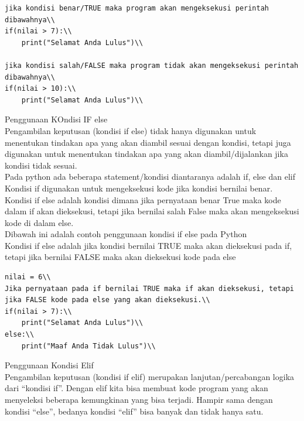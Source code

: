 \begin{enumerate}
\begin{verbatim}
jika kondisi benar/TRUE maka program akan mengeksekusi perintah dibawahnya\\
if(nilai > 7):\\
    print("Selamat Anda Lulus")\\

jika kondisi salah/FALSE maka program tidak akan mengeksekusi perintah dibawahnya\\
if(nilai > 10):\\
    print("Selamat Anda Lulus")\\
\end{verbatim}

Penggunaan KOndisi IF else\\

Pengambilan keputusan (kondisi if else) tidak hanya digunakan untuk menentukan tindakan apa yang akan diambil sesuai dengan kondisi, tetapi juga digunakan untuk menentukan tindakan apa yang akan diambil/dijalankan jika kondisi tidak sesuai.
\\
Pada python ada beberapa statement/kondisi diantaranya adalah if, else dan elif Kondisi if digunakan untuk mengeksekusi kode jika kondisi bernilai benar.
\\
Kondisi if else adalah kondisi dimana jika pernyataan benar True maka kode dalam if akan dieksekusi, tetapi jika bernilai salah False maka akan mengeksekusi kode di dalam else.
\\
Dibawah ini adalah contoh penggunaan kondisi if else pada Python
\\

Kondisi if else adalah jika kondisi bernilai TRUE maka akan dieksekusi pada if, tetapi jika bernilai FALSE maka akan dieksekusi kode pada else\\
\begin{verbatim}
nilai = 6\\
Jika pernyataan pada if bernilai TRUE maka if akan dieksekusi, tetapi jika FALSE kode pada else yang akan dieksekusi.\\
if(nilai > 7):\\
    print("Selamat Anda Lulus")\\
else:\\
    print("Maaf Anda Tidak Lulus")\\

\end{verbatim}


Penggunaan Kondisi Elif \\
Pengambilan keputusan (kondisi if elif) merupakan lanjutan/percabangan logika dari “kondisi if”. Dengan elif kita bisa membuat kode program yang akan menyeleksi beberapa kemungkinan yang bisa terjadi. Hampir sama dengan kondisi “else”, bedanya kondisi “elif” bisa banyak dan tidak hanya satu.\\


\end{enumerate}
